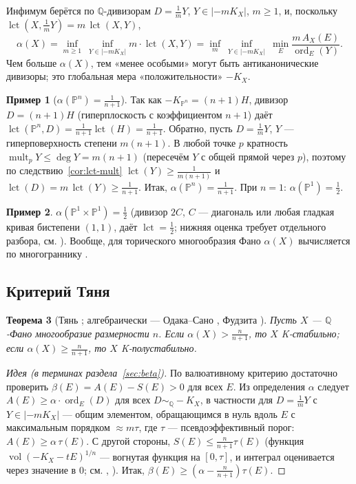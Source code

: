 \documentclass[11pt,a4paper]{article}
\theoremstyle{plain}
\newtheorem{theorem}{Теорема}[section]
\theoremstyle{definition}
\newtheorem{example}[theorem]{Пример}
\theoremstyle{remark}
\newcommand{\Q}{\mathbb{Q}}
\newcommand{\PP}{\mathbb{P}}
\DeclareMathOperator{\ord}{ord}
\DeclareMathOperator{\vol}{vol}
\DeclareMathOperator{\lct}{lct}
\DeclareMathOperator{\mult}{mult}
\begin{document}
Инфимум берётся по $\Q$-дивизорам $D=\frac1mY$, $Y\in|-mK_X|$, $m\ge1$, и, поскольку
$\lct(X,\frac1mY)=m\,\lct(X,Y)$,
\[
\alpha(X)=\inf_{m\ge1}\ \inf_{Y\in|-mK_X|}m\cdot\lct(X,Y)
=\inf_{m}\ \inf_{Y\in|-mK_X|}\ \min_{E}\frac{m\,A_X(E)}{\ord_E(Y)} .
\]
Чем больше $\alpha(X)$, тем «менее особыми» могут быть антиканонические дивизоры; это глобальная
мера «положительности» $-K_X$.

\begin{example}[$\alpha(\PP^n)=\frac1{n+1}$]\label{ex:alpha-Pn}
Так как $-K_{\PP^n}=(n+1)H$, дивизор $D=(n+1)H$ (гиперплоскость с коэффициентом $n+1$) даёт
$\lct(\PP^n,D)=\frac1{n+1}\lct(H)=\frac1{n+1}$. Обратно, пусть $D=\frac1mY$, $Y$ --- гиперповерхность
степени $m(n+1)$. В любой точке $p$ кратность $\mult_pY\le\deg Y=m(n+1)$ (пересечём $Y$ с общей
прямой через $p$), поэтому по следствию~\ref{cor:lct-mult} $\lct(Y)\ge\frac1{m(n+1)}$ и
$\lct(D)=m\,\lct(Y)\ge\frac1{n+1}$. Итак, $\alpha(\PP^n)=\frac1{n+1}$. При $n=1$: $\alpha(\PP^1)=\frac12$.
\end{example}

\begin{example}
$\alpha(\PP^1\times\PP^1)=\frac12$ (дивизор $2C$, $C$ --- диагональ или любая гладкая кривая
бистепени $(1,1)$, даёт $\lct=\frac12$; нижняя оценка требует отдельного разбора, см.
\cite{Che08}). Вообще, для торического многообразия Фано $\alpha(X)$ вычисляется по многограннику
\cite{Song}.
\end{example}

\subsection{Критерий Тяня}

\begin{theorem}[{Тянь \cite{Tia87}; алгебраически --- Одака--Сано \cite{OS12}, Фудзита \cite{Fuj19a}}]\label{thm:Tian-alpha}
Пусть $X$ --- $\Q$-Фано многообразие размерности $n$. Если $\alpha(X)>\frac n{n+1}$, то $X$
K-стабильно; если $\alpha(X)\ge\frac n{n+1}$, то $X$ K-полустабильно.
\end{theorem}

\begin{proof}[Идея (в терминах раздела~\ref{sec:beta})]
По валюативному критерию достаточно проверить $\beta(E)=A(E)-S(E)>0$ для всех $E$. Из определения
$\alpha$ следует $A(E)\ge\alpha\cdot\ord_E(D)$ для всех $D\sim_\Q-K_X$, в частности для
$D=\frac1mY$ с $Y\in|-mK_X|$ --- общим элементом, обращающимся в нуль вдоль $E$ с максимальным
порядком $\approx m\tau$, где $\tau$ --- псевдоэффективный порог: $A(E)\ge\alpha\,\tau(E)$. С другой
стороны, $S(E)\le\frac n{n+1}\tau(E)$ (функция $\vol(-K_X-tE)^{1/n}$ ---
вогнутая функция на $[0,\tau]$, и интеграл оценивается через значение в $0$; см.
\cite{Fuj19b}, \cite[\S\,7]{BJ}). Итак, $\beta(E)\ge(\alpha-\frac n{n+1})\tau(E)$.
\end{proof}
\end{document}

